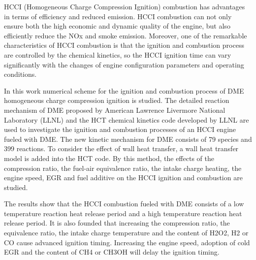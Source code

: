 \begin{abstract}
	均质压燃（HCCI）燃烧作为一种能实现高效低污染燃烧方式，能够使发动机同时具备较高的经济性、动力性和排放性能，可有效降低发动机NOx和碳烟排放。然而HCCI燃烧的一个显著特点是燃烧着火时刻和燃烧放热率主要受化学动力学控制，因此，发动机结构参数和运行工况的改变将显著影响HCCI燃烧着火和燃烧放热过程。

	本文以二甲醚（DME）为燃料，对HCCI燃烧着火和燃烧放热过程进行了数值研究。研究中采用了美国Lawrence Livermore国家实验室提出的DME详细化学动力学反应机理和该实验室开发的HCT化学动力学计算程序，对DME均质压燃燃烧过程进行了详细模拟。新的DME动力学机理包含79个物种和399个反应。为考虑壁面传热的影响，在HCT程序中加入了壁面传热模型。用该方法研究了压缩比、燃空当量比、进气加热、发动机转速、EGR和燃料添加剂等对HCCI着火和燃烧的影响。

	研究结果表明，DME的HCCI燃烧过程由低温反应放热阶段和高温反应放热阶段组成。还发现增加压缩比、当量比、进气温度和H2O2、H2或CO的含量使着火提前。增加发动机转速、采用冷EGR和CH4或CH3OH的含量将推迟着火。

\end{abstract}

\begin{enabstract}
	HCCI (Homogeneous Charge Compression Ignition) combustion has advantages in terms of efficiency and reduced emission. HCCI combustion can not only ensure both the high economic and dynamic quality of the engine, but also efficiently reduce the NOx and smoke emission. Moreover, one of the remarkable characteristics of HCCI combustion is that the ignition and combustion process are controlled by the chemical kinetics, so the HCCI ignition time can vary significantly with the changes of engine configuration parameters and operating conditions.

	In this work numerical scheme for the ignition and combustion process of DME homogeneous charge compression ignition is studied. The detailed reaction mechanism of DME proposed by American Lawrence Livermore National Laboratory (LLNL) and the HCT chemical kinetics code developed by LLNL are used to investigate the ignition and combustion processes of an HCCI engine fueled with DME. The new kinetic mechanism for DME consists of 79 species and 399 reactions. To consider the effect of wall heat transfer, a wall heat transfer model is added into the HCT code. By this method, the effects of the compression ratio, the fuel-air equivalence ratio, the intake charge heating, the engine speed, EGR and fuel additive on the HCCI ignition and combustion are studied.

	The results show that the HCCI combustion fueled with DME consists of a low temperature reaction heat release period and a high temperature reaction heat release period. It is also founded that increasing the compression ratio, the equivalence ratio, the intake charge temperature and the content of H2O2, H2 or CO cause advanced ignition timing. Increasing the engine speed, adoption of cold EGR and the content of CH4 or CH3OH will delay the ignition timing.

\end{enabstract}
